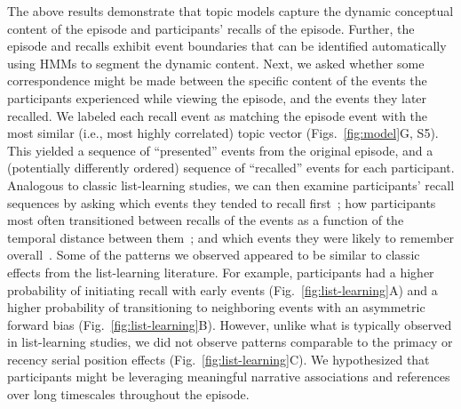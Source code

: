 \documentclass[10pt]{article}
\newcommand{\matchmats}{S5}
\begin{document}
The above results demonstrate that topic models capture the dynamic conceptual content of the episode and participants' recalls of the episode.  Further, the episode and recalls exhibit event boundaries that can be identified automatically using HMMs to segment the dynamic content.  Next, we asked whether some correspondence might be made between the specific content of the events the participants experienced while viewing the episode, and the events they later recalled.  We labeled each recall event as matching the episode event with the most similar (i.e., most highly correlated) topic vector (Figs.~\ref{fig:model}G, \matchmats).  This yielded a sequence of ``presented'' events from the original episode, and a (potentially differently ordered) sequence of ``recalled'' events for each participant.  Analogous to classic list-learning studies, we can then examine participants' recall sequences by asking which events they tended to recall first~\citep[probability of first recall; Fig.~\ref{fig:list-learning}A;][]{AtkiShif68, PostPhil65, WelcBurn24}; how participants most often transitioned between recalls of the events as a function of the temporal distance between them~\citep[lag-conditional response probability; Fig.~\ref{fig:list-learning}B;][]{Kaha96}; and which events they were likely to remember overall~\citep[serial position recall analyses; Fig.~\ref{fig:list-learning}C;][]{Murd62a}. Some of the patterns we observed appeared to be similar to classic effects from the list-learning literature.  For example, participants had a higher probability of initiating recall with early events (Fig.~\ref{fig:list-learning}A) and a higher probability of transitioning to neighboring events with an asymmetric forward bias (Fig.~\ref{fig:list-learning}B). However, unlike what is typically observed in list-learning studies, we did not observe patterns comparable to the primacy or recency serial position effects (Fig.~\ref{fig:list-learning}C).  We hypothesized that participants might be leveraging meaningful narrative associations and references over long timescales throughout the episode.
\end{document}
